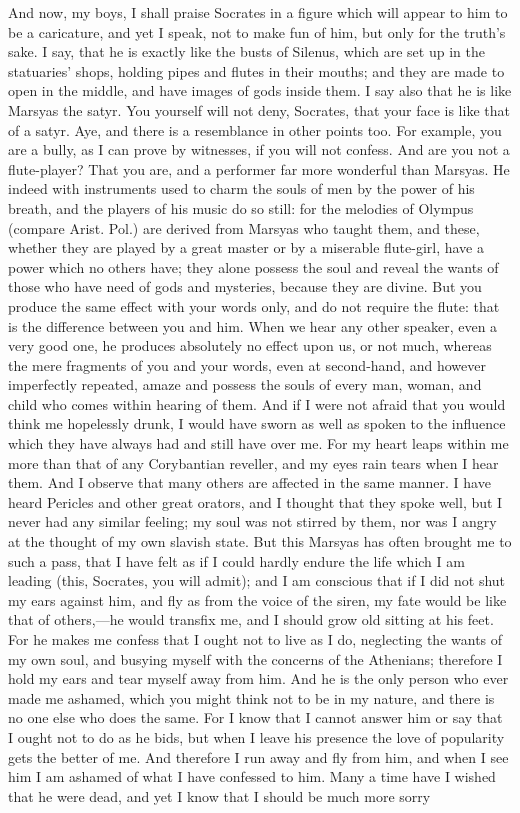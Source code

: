 \documentclass[11pt,letter]{article}
\begin{document}
\par  And now, my boys, I shall praise Socrates in a figure which will appear to him to be a caricature, and yet I speak, not to make fun of him, but only for the truth's sake. I say, that he is exactly like the busts of Silenus, which are set up in the statuaries' shops, holding pipes and flutes in their mouths; and they are made to open in the middle, and have images of gods inside them. I say also that he is like Marsyas the satyr. You yourself will not deny, Socrates, that your face is like that of a satyr. Aye, and there is a resemblance in other points too. For example, you are a bully, as I can prove by witnesses, if you will not confess. And are you not a flute-player? That you are, and a performer far more wonderful than Marsyas. He indeed with instruments used to charm the souls of men by the power of his breath, and the players of his music do so still: for the melodies of Olympus (compare Arist. Pol.) are derived from Marsyas who taught them, and these, whether they are played by a great master or by a miserable flute-girl, have a power which no others have; they alone possess the soul and reveal the wants of those who have need of gods and mysteries, because they are divine. But you produce the same effect with your words only, and do not require the flute: that is the difference between you and him. When we hear any other speaker, even a very good one, he produces absolutely no effect upon us, or not much, whereas the mere fragments of you and your words, even at second-hand, and however imperfectly repeated, amaze and possess the souls of every man, woman, and child who comes within hearing of them. And if I were not afraid that you would think me hopelessly drunk, I would have sworn as well as spoken to the influence which they have always had and still have over me. For my heart leaps within me more than that of any Corybantian reveller, and my eyes rain tears when I hear them. And I observe that many others are affected in the same manner. I have heard Pericles and other great orators, and I thought that they spoke well, but I never had any similar feeling; my soul was not stirred by them, nor was I angry at the thought of my own slavish state. But this Marsyas has often brought me to such a pass, that I have felt as if I could hardly endure the life which I am leading (this, Socrates, you will admit); and I am conscious that if I did not shut my ears against him, and fly as from the voice of the siren, my fate would be like that of others,—he would transfix me, and I should grow old sitting at his feet. For he makes me confess that I ought not to live as I do, neglecting the wants of my own soul, and busying myself with the concerns of the Athenians; therefore I hold my ears and tear myself away from him. And he is the only person who ever made me ashamed, which you might think not to be in my nature, and there is no one else who does the same. For I know that I cannot answer him or say that I ought not to do as he bids, but when I leave his presence the love of popularity gets the better of me. And therefore I run away and fly from him, and when I see him I am ashamed of what I have confessed to him. Many a time have I wished that he were dead, and yet I know that I should be much more sorry 
\end{document}
